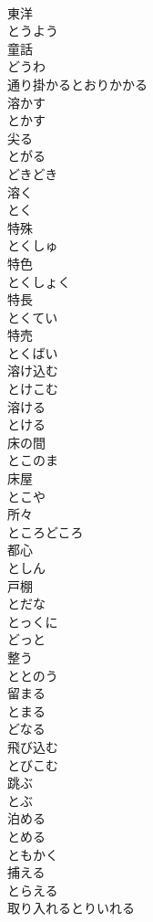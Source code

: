 \documentclass[8pt]{extreport}
\begin{document}
\begin{CJK}{UTF8}{min}
\\	東洋 
\\	とうよう	
\\	童話 
\\	どうわ	
\\	通り掛かるとおりかかる	
\\	溶かす 
\\	とかす	
\\	尖る 
\\	とがる	
\\	どきどき	
\\	溶く 
\\	とく	
\\	特殊 
\\	とくしゅ	
\\	特色 
\\	とくしょく	
\\	特長 
\\	とくてい	
\\	特売 
\\	とくばい	
\\	溶け込む 
\\	とけこむ	
\\	溶ける 
\\	とける	
\\	床の間 
\\	とこのま	
\\	床屋 
\\	とこや	
\\	所々 
\\	ところどころ	
\\	都心 
\\	としん	
\\	戸棚 
\\	とだな	
\\	とっくに	
\\	どっと	
\\	整う 
\\	ととのう	
\\	留まる 
\\	とまる	
\\	どなる	
\\	飛び込む 
\\	とびこむ	
\\	跳ぶ 
\\	とぶ	
\\	泊める 
\\	とめる	
\\	ともかく	
\\	捕える 
\\	とらえる	
\\	取り入れるとりいれる	

\end{CJK}
\end{document}
